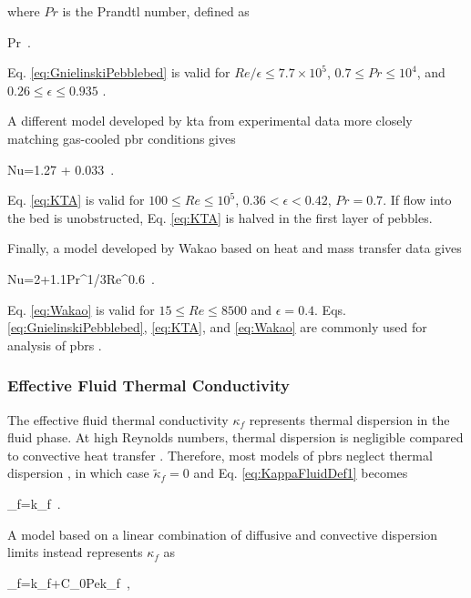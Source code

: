 \noindent where \(Pr\) is the Prandtl number, defined as

\beq
\label{eq:Prandtl}
Pr\equiv{}\ .
\eeq

\noindent Eq. \eqref{eq:GnielinskiPebblebed} is valid for \(Re/\epsilon \leq 7.7\times 10^5\), \(0.7\leq Pr\leq 10^4\), and \(0.26\leq\epsilon\leq 0.935\) \cite{achenbach}. 

A different model developed by \gls{kta} from experimental data more closely matching gas-cooled \gls{pbr} conditions gives \cite{KTAhtc}

\beq
\label{eq:KTA}
Nu=1.27  + 0.033\ .
\eeq

\noindent Eq. \eqref{eq:KTA} is valid for \(100 \leq Re \leq 10^5\), \(0.36< \epsilon< 0.42\), \(Pr=0.7\). If flow into the bed is unobstructed, Eq. \eqref{eq:KTA} is halved in the first layer of pebbles.

Finally, a model developed by Wakao based on heat and mass transfer data gives \cite{wakao}

\beq
\label{eq:Wakao}
Nu=2+1.1Pr^{1/3}Re^{0.6}\ .
\eeq

\noindent Eq. \eqref{eq:Wakao} is valid for \(15\leq Re\leq8500\) and \(\epsilon=0.4\). Eqs. \eqref{eq:GnielinskiPebblebed}, \eqref{eq:KTA}, and \eqref{eq:Wakao} are commonly used for analysis of \glspl{pbr} \cite{auwerda_2011, becker, becker2003,avigni,gao, suikkanen,scarlat,y_li,xin_wang_thesis,cai}.

\subsubsection{Effective Fluid Thermal Conductivity}
\label{sec:Kappa}

The effective fluid thermal conductivity \(\kappa_f\) represents thermal dispersion in the fluid phase. At high Reynolds numbers, thermal dispersion is negligible compared to convective heat transfer \cite{gunn1987_htc,littman}. Therefore, most models of \glspl{pbr} neglect thermal dispersion \cite{suikkanen,y_li}, in which case \(\tilde{\kappa}_f=0\) and Eq. \eqref{eq:KappaFluidDef1} becomes

\beq
\label{eq:KappaFluidBasic}
\kappa_f=\epsilon k_f\ .
\eeq

\noindent A model based on a linear combination of diffusive and convective dispersion limits instead represents \(\kappa_f\) as

\beq
\label{eq:LinearPecletKappaFluid}
\kappa_f=\epsilon k_f+C_0Pek_f\ ,
\eeq


